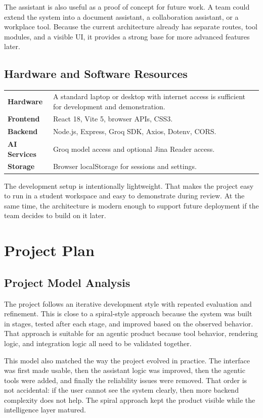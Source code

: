 \documentclass[11pt,oneside]{report}
\begin{document}
The assistant is also useful as a proof of concept for future work. A team could extend the system into a document assistant, a collaboration assistant, or a workplace tool. Because the current architecture already has separate routes, tool modules, and a visible UI, it provides a strong base for more advanced features later.

\section{Hardware and Software Resources}
\begin{tabularx}{\textwidth}{>{\bfseries}p{}X}
Hardware & A standard laptop or desktop with internet access is sufficient for development and demonstration. \\
Frontend & React 18, Vite 5, browser APIs, CSS3. \\
Backend & Node.js, Express, Groq SDK, Axios, Dotenv, CORS. \\
AI Services & Groq model access and optional Jina Reader access. \\
Storage & Browser localStorage for sessions and settings. \\
\end{tabularx}

The development setup is intentionally lightweight. That makes the project easy to run in a student workspace and easy to demonstrate during review. At the same time, the architecture is modern enough to support future deployment if the team decides to build on it later.

\chapter{Project Plan}
\section{Project Model Analysis}
The project follows an iterative development style with repeated evaluation and refinement. This is close to a spiral-style approach because the system was built in stages, tested after each stage, and improved based on the observed behavior. That approach is suitable for an agentic product because tool behavior, rendering logic, and integration logic all need to be validated together.

This model also matched the way the project evolved in practice. The interface was first made usable, then the assistant logic was improved, then the agentic tools were added, and finally the reliability issues were removed. That order is not accidental: if the user cannot see the system clearly, then more backend complexity does not help. The spiral approach kept the product visible while the intelligence layer matured.
\end{document}
